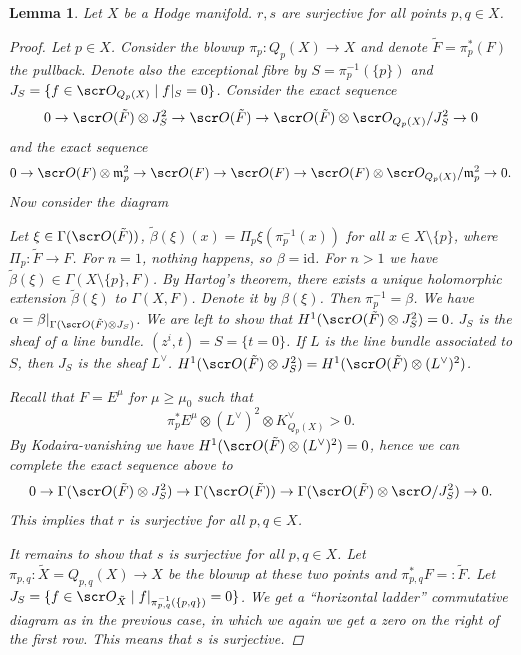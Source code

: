 \documentclass[A4paper, british, reqno]{amsart}
\theoremstyle{darkgreentheorem}
\newtheorem{lm}[thm]{Lemma}
\theoremstyle{darkbluedefinition}
\theoremstyle{darkredexample}
\theoremstyle{remark}
\newcommand{\1}{\mathbbm{1}}
\newcommand{\ot}{\otimes}
\newcommand{\id}{\mathrm{id}}
\newcommand{\dual}{^{\vee}}
\begin{document}
\begin{lm}
    Let $X$ be a Hodge manifold.
    $r,s$ are surjective for all points $p,q\in X$.
    \begin{proof}
	Let $p\in X$.
	Consider the blowup $\pi_{p}\colon Q_{p}(X)\to X$ and denote $\tilde{F}=\pi_{p}^{*}(F)$ the pullback.
	Denote also the exceptional fibre by $S=\pi_{p}^{-1}(\{p\})$ and $J_{S}=\{f\in \O_{Q_{p}(X)}\mid f|_{S}=0\}$.
	Consider the exact sequence
	\[ 0\to \O(\tilde{F})\ot J_{S}^{2}\to \O(\tilde{F})\to \O(\tilde{F})\ot \O_{Q_{p}(X)}/J_{S}^{2}\to 0 \]
	and the exact sequence
	\[ 0\to \O(F)\ot \m_{p}^{2}\to \O(F)\to \O(F)\to \O(F)\ot \O_{Q_{p}(X)}/\m_{p}^{2}\to 0. \]
	Now consider the diagram
	\begin{center}
	\end{center}
	Let $\xi\in \Gamma(\O(\tilde{F}))$, $\tilde{\beta}(\xi)(x)=\Pi_{p}\xi(\pi_{p}^{-1}(x))$ for all $x\in X\setminus \{p\}$, where $\Pi_{p}\colon \tilde{F}\to F$.
	For $n=1$, nothing happens, so $\beta=\id$.
	For $n>1$ we have $\tilde{\beta}(\xi)\in \Gamma(X\setminus \{p\},F)$.
	By Hartog's theorem, there exists a unique holomorphic extension $\tilde{\beta}(\xi)$ to $\Gamma(X,F)$.
	Denote it by $\beta(\xi)$.
	Then $\pi_{p}^{-1}=\beta$.
	We have $\alpha=\beta|_{\Gamma(\O(\tilde{F})\ot J_{S})}$.
	We are left to show that $H^{1}(\O(\tilde{F})\ot J_{S}^{2})=0$.
	$J_{S}$ is the sheaf of a line bundle.
	$(z^{i},t)=S=\{t=0\}$.
	If $L$ is the line bundle associated to $S$, then $J_{S}$ is the sheaf $L\dual$.
	$H^{1}(\O(\tilde{F})\ot J_{S}^{2})=H^{1}(\O(\tilde{F})\ot (L\dual)^{2})$.

	Recall that $F=E^{\mu}$ for $\mu\geqslant \mu_{0}$ such that
	\[ \pi_{p}^{*}E^{\mu}\ot (L\dual)^{2}\ot K_{Q_{p}(X)}\dual >0.\]
	By Kodaira-vanishing we have $H^{1}(\O(\tilde{F})\ot (L\dual)^{2})=0$, hence we can complete the exact sequence above to
	\[ 0\to \Gamma(\O(\tilde{F})\ot J_{S}^{2})\to \Gamma(\O(\tilde{F}))\to \Gamma(\O(\tilde{F})\ot \O/J_{S}^{2}) \to 0.\]
	This implies that $r$ is surjective for all $p,q\in X$.
	
	It remains to show that $s$ is surjective for all $p,q\in X$.
	Let $\pi_{p,q}\colon \tilde{X}=Q_{p,q}(X)\to X$ be the blowup at these two points and $\pi_{p,q}^{*}F=:\tilde{F}$.
	Let $J_{S}=\{f\in \O_{\tilde{X}}\mid f|_{\pi_{p,q}^{-1}(\{p,q\})}=0 \}$.
	We get a ``horizontal ladder'' commutative diagram as in the previous case, in which we again we get a zero on the right of the first row.
	This means that $s$ is surjective.
    \end{proof}
\end{lm}
\end{document}
